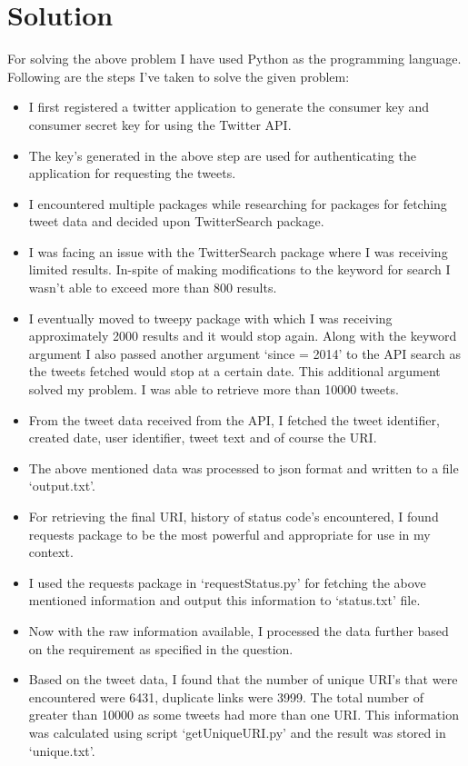 \section{Solution}
For solving the above problem I have used Python as the programming language. Following are the steps I've taken to solve the given problem:
\begin{itemize}
\item I first registered a twitter application to generate the consumer key and consumer secret key for using the Twitter API.
\item The key's generated in the above step are used for authenticating the application for requesting the tweets.
\item I encountered multiple packages while researching for packages for fetching tweet data and decided upon TwitterSearch package.
\item I was facing an issue with the TwitterSearch package where I was receiving limited results. In-spite of making modifications to the keyword for search I wasn't able to exceed more than 800 results.
\item I eventually moved to tweepy package with which I was receiving approximately 2000 results and it would stop again. Along with the keyword argument I also passed another argument `since = 2014' to the API search as the tweets fetched would stop at a certain date. This additional argument solved my problem. I was able to retrieve more than 10000 tweets.
\item From the tweet data received from the API, I fetched the tweet identifier, created date, user identifier, tweet text and of course the URI.
\item The above mentioned data was processed to json format and written to a file `output.txt'.
\item For retrieving the final URI, history of status code's encountered, I found requests package to be the most powerful and appropriate for use in my context.
\item I used the requests package in `requestStatus.py' for fetching the above mentioned information and output this information to `status.txt' file.
\item Now with the raw information available, I processed the data further based on the requirement as specified in the question.
\item Based on the tweet data, I found that the number of unique URI's that were encountered were 6431, duplicate links were 3999. The total number of greater than 10000 as some tweets had more than one URI. This information was calculated using script `getUniqueURI.py' and the result was stored in `unique.txt'.

\end{itemize}
